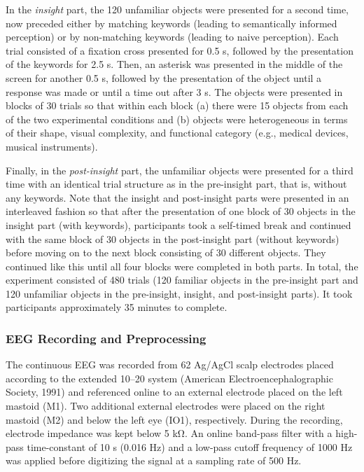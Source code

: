 \documentclass[
  english,
  doc,12pt,twoside,floatsintext]{apa7}
\begin{document}
In the \emph{insight} part, the 120 unfamiliar objects were presented for a second time, now preceded either by matching keywords (leading to semantically informed perception) or by non-matching keywords (leading to naive perception). Each trial consisted of a fixation cross presented for 0.5 s, followed by the presentation of the keywords for 2.5 s. Then, an asterisk was presented in the middle of the screen for another 0.5 s, followed by the presentation of the object until a response was made or until a time out after 3 s. The objects were presented in blocks of 30 trials so that within each block (a) there were 15 objects from each of the two experimental conditions and (b) objects were heterogeneous in terms of their shape, visual complexity, and functional category (e.g., medical devices, musical instruments).

Finally, in the \emph{post-insight} part, the unfamiliar objects were presented for a third time with an identical trial structure as in the pre-insight part, that is, without any keywords. Note that the insight and post-insight parts were presented in an interleaved fashion so that after the presentation of one block of 30 objects in the insight part (with keywords), participants took a self-timed break and continued with the same block of 30 objects in the post-insight part (without keywords) before moving on to the next block consisting of 30 different objects. They continued like this until all four blocks were completed in both parts. In total, the experiment consisted of 480 trials (120 familiar objects in the pre-insight part and 120 unfamiliar objects in the pre-insight, insight, and post-insight parts). It took participants approximately 35 minutes to complete.

\hypertarget{eeg-recording-and-preprocessing}{%
\subsubsection{EEG Recording and Preprocessing}\label{eeg-recording-and-preprocessing}}

The continuous EEG was recorded from 62 Ag/AgCl scalp electrodes placed according to the extended 10--20 system (American Electroencephalographic Society, 1991) and referenced online to an external electrode placed on the left mastoid (M1). Two additional external electrodes were placed on the right mastoid (M2) and below the left eye (IO1), respectively. During the recording, electrode impedance was kept below 5 kΩ. An online band-pass filter with a high-pass time-constant of 10 s (0.016 Hz) and a low-pass cutoff frequency of 1000 Hz was applied before digitizing the signal at a sampling rate of 500 Hz.
\end{document}

